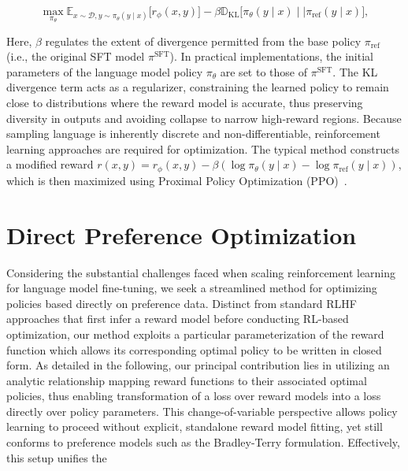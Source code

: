 \begin{equation}\label{eq:RL}
\max_{\pi_{\theta}}  \mathbb{E}_{x\sim \mathcal{D}, y\sim \pi_{\theta}(y \mid x)}\bigl[r_{\phi}(x, y)\bigr] - \beta\mathbb{D}_{\textrm{KL}}\bigl[\pi_{\theta}(y\mid x)\mid \mid \pi_\text{ref}(y\mid x)\bigr],
\end{equation}

Here, $\beta$ regulates the extent of divergence permitted from the base policy $\pi_\text{ref}$ (i.e., the original SFT model $\pi^\text{SFT}$). In practical implementations, the initial parameters of the language model policy $\pi_\theta$ are set to those of $\pi^\text{SFT}$. The KL divergence term acts as a regularizer, constraining the learned policy to remain close to distributions where the reward model is accurate, thus preserving diversity in outputs and avoiding collapse to narrow high-reward regions. Because sampling language is inherently discrete and non-differentiable, reinforcement learning approaches are required for optimization. The typical method \citep{ziegler2020finetuning, stiennon2022learning, bai2022training, ouyang2022training} constructs a modified reward $r(x, y) = r_{\phi}(x, y) -\beta (\log \pi_{\theta}(y\mid x) - \log \pi_\text{ref}(y\mid x))$, which is then maximized using Proximal Policy Optimization (PPO)~\cite{schulman2017proximal}.

\section{Direct Preference Optimization}\label{sec:DPO}

Considering the substantial challenges faced when scaling reinforcement learning for language model fine-tuning, we seek a streamlined method for optimizing policies based directly on preference data. Distinct from standard RLHF approaches that first infer a reward model before conducting RL-based optimization, our method exploits a particular parameterization of the reward function which allows its corresponding optimal policy to be written in closed form. As detailed in the following, our principal contribution lies in utilizing an analytic relationship mapping reward functions to their associated optimal policies, thus enabling transformation of a loss over reward models into a loss directly over policy parameters. This change-of-variable perspective allows policy learning to proceed without explicit, standalone reward model fitting, yet still conforms to preference models such as the Bradley-Terry formulation. Effectively, this setup unifies the

